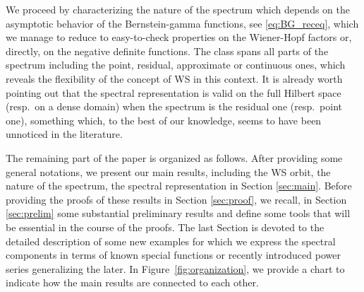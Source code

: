 \documentclass[12pt]{amsart}
\numberwithin{equation}{section}
\theoremstyle{definition}
\theoremstyle{assump}
\theoremstyle{remark}
\begin{document}
We proceed by characterizing the nature of the spectrum which depends on the asymptotic behavior of the Bernstein-gamma functions, see \eqref{eq:BG_receq}, which we manage to reduce to easy-to-check properties on the Wiener-Hopf factors or, directly, on the negative definite functions. The class spans all parts of the spectrum including  the point, residual, approximate or continuous ones, which reveals the flexibility of the concept of WS in this context.  It is already worth pointing out that the spectral representation is valid on  the full Hilbert space (resp.~on a dense domain) when the spectrum is the residual one (resp.~point one), something which, to the best of our knowledge, seems to have been unnoticed in the literature.

The remaining part of the paper is organized as follows. After providing some general notations, we present our main results, including the WS orbit, the nature of the spectrum, the spectral representation  in Section \ref{sec:main}. Before providing the proofs of these results in Section \ref{sec:proof}, we recall, in Section \ref{sec:prelim} some substantial preliminary results and define some tools  that will be essential in the course of the proofs. The last Section is devoted to the detailed description of some new examples for which we express the spectral components in terms of known special functions or recently introduced power series generalizing the later. In Figure~\ref{fig:organization}, we provide a chart to indicate how the main results are connected to each other.
\end{document}
